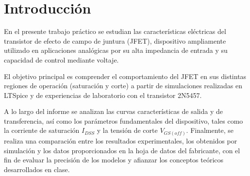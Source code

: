 \chapter{Introducción}
En el presente trabajo práctico se estudian las características eléctricas del transistor de efecto de campo de juntura
(JFET), dispositivo ampliamente utilizado en aplicaciones analógicas por su alta impedancia de entrada y su capacidad de
control mediante voltaje. 

El objetivo principal es comprender el comportamiento del JFET en sus distintas regiones de operación (saturación y
corte) a partir de simulaciones realizadas en LTSpice y de experiencias de laboratorio con el transistor 2N5457. 

A lo largo del informe se analizan las curvas características de salida y de transferencia, así como los parámetros
fundamentales del dispositivo, tales como la corriente de saturación $I_{DSS}$ y la tensión de corte $V_{GS(off)}$.
Finalmente, se realiza una comparación entre los resultados experimentales, los obtenidos por simulación y los datos
proporcionados en la hoja de datos del fabricante, con el fin de evaluar la precisión de los modelos y afianzar los
conceptos teóricos desarrollados en clase.
